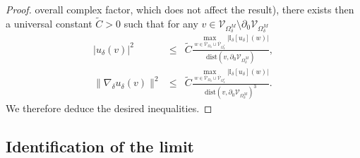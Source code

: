 \documentclass[oneside,english]{amsart}
\numberwithin{equation}{section}
\numberwithin{figure}{section}
\theoremstyle{plain}
\theoremstyle{plain}
\theoremstyle{plain}
\theoremstyle{plain}
\theoremstyle{plain}
\theoremstyle{definition}
\theoremstyle{remark}
\begin{document}
\begin{proof}
overall complex factor, which does not affect the result), there exists
then a universal constant $\tilde{C}>0$ such that for any $v\in\mathcal{V}_{\Omega_{\delta}^{M}}\setminus\partial_{0}\mathcal{V}_{\Omega_{\delta}^{M}}$
\begin{eqnarray*}
\left|u_{\delta}\left(v\right)\right|^{2} & \leq & \tilde{C}\frac{\max_{w\in\overline{\mathcal{V}}_{\Omega_{\delta}}\cup\overline{\mathcal{V}}_{\Omega_{\delta}^{*}}}\left|\mathbb{I}_{\delta}\left[u_{\delta}\right]\left(w\right)\right|}{\mathrm{dist}\left(v,\partial_{0}\mathcal{V}_{\Omega_{\delta}^{M}}\right)},\\
\|\nabla_{\delta}u_{\delta}\left(v\right)\|^{2} & \leq & \tilde{C}\frac{\max_{w\in\overline{\mathcal{V}}_{\Omega_{\delta}}\cup\overline{\mathcal{V}}_{\Omega_{\delta}^{*}}}\left|\mathbb{I}_{\delta}\left[u_{\delta}\right]\left(w\right)\right|}{\mathrm{dist}\left(v,\partial_{0}\mathcal{V}_{\Omega_{\delta}^{M}}\right)^{3}}.
\end{eqnarray*}
We therefore deduce the desired inequalities.
\end{proof}

\subsection{Identification of the limit}
\end{document}
